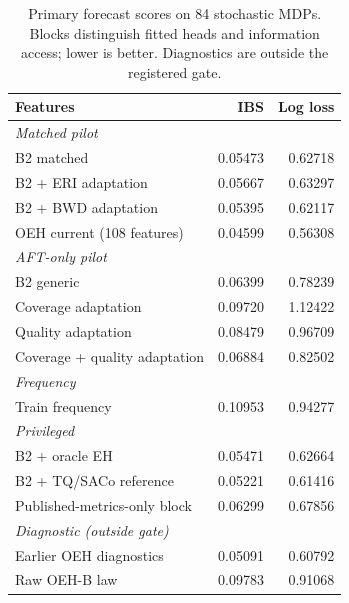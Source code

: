 \begin{table}[t]
\centering\small
\caption{Primary forecast scores on 84 stochastic MDPs. Blocks distinguish fitted heads and information access; lower is better. Diagnostics are outside the registered gate.}
\label{tab:d1-primary}
\begin{tabular}{lrr}\toprule
Features & IBS & Log loss\\\midrule
\multicolumn{3}{l}{\textit{Matched pilot}}\\
B2 matched & 0.05473 & 0.62718\\
B2 + ERI adaptation & 0.05667 & 0.63297\\
B2 + BWD adaptation & 0.05395 & 0.62117\\
OEH current (108 features) & 0.04599 & 0.56308\\
\multicolumn{3}{l}{\textit{AFT-only pilot}}\\
B2 generic & 0.06399 & 0.78239\\
Coverage adaptation & 0.09720 & 1.12422\\
Quality adaptation & 0.08479 & 0.96709\\
Coverage + quality adaptation & 0.06884 & 0.82502\\
\multicolumn{3}{l}{\textit{Frequency}}\\
Train frequency & 0.10953 & 0.94277\\
\multicolumn{3}{l}{\textit{Privileged}}\\
B2 + oracle EH & 0.05471 & 0.62664\\
B2 + TQ/SACo reference & 0.05221 & 0.61416\\
Published-metrics-only block & 0.06299 & 0.67856\\
\multicolumn{3}{l}{\textit{Diagnostic (outside gate)}}\\
Earlier OEH diagnostics & 0.05091 & 0.60792\\
Raw OEH-B law & 0.09783 & 0.91068\\
\bottomrule\end{tabular}
\end{table}
